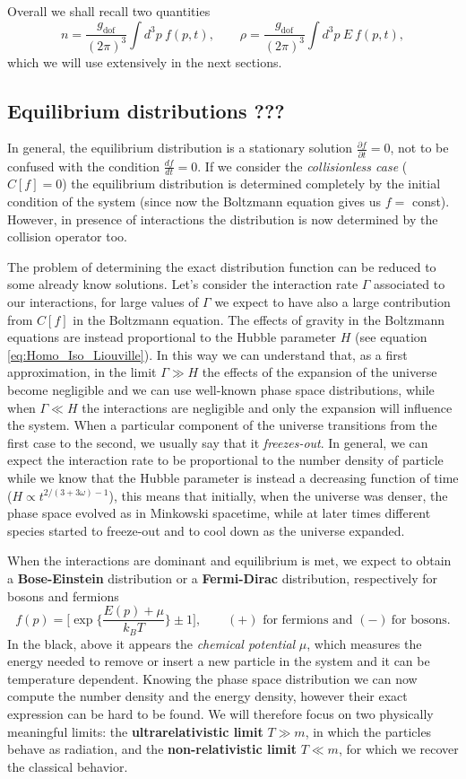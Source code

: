 Overall we shall recall two quantities
$$
n=\frac{g_\text{dof}}{(2\pi)^3}\int d^3p\ f(p,t),\qquad \rho=\frac{g_\text{dof}}{(2\pi)^3}\int d^3p\ E\ f(p,t),
$$
which we will use extensively in the next sections.
\subsection{Equilibrium distributions ???}
In general, the equilibrium distribution is a stationary solution $\tfrac{\partial f}{\partial t}=0$, not to be confused with the condition $\tfrac{d f}{dt}=0$. If we consider the \emph{collisionless case} ($C[f]=0$) the equilibrium distribution is determined completely by the initial condition of the system (since now the Boltzmann equation gives us $f=$ const). However, in presence of interactions the distribution is now determined by the collision operator too. 

The problem of determining the exact distribution function can be reduced to some already know solutions. Let's consider the interaction rate $\Gamma$ associated to our interactions, for large values of $\Gamma$ we expect to have also a large contribution from $C[f]$ in the Boltzmann equation. The effects of gravity in the Boltzmann equations are instead proportional to the Hubble parameter $H$ (see equation \eqref{eq:Homo_Iso_Liouville}). In this way we can understand that, as a first approximation, in the limit $\Gamma\gg H$ the effects of the expansion of the universe become negligible and we can use well-known phase space distributions, while when $\Gamma\ll H$ the interactions are negligible and only the expansion will influence the system. When a particular component of the universe transitions from the first case to the second, we usually say that it \emph{freezes-out}. In general, we can expect the interaction rate to be proportional to the number density of particle while we know that the Hubble parameter is instead a decreasing function of time ($H\propto t^{2/(3+3\omega)-1}$), this means that initially, when the universe was denser, the phase space evolved as in Minkowski spacetime, while at later times different species started to freeze-out and to cool down as the universe expanded.

When the interactions are dominant and equilibrium is met, we expect to obtain a \textbf{Bose-Einstein} distribution or a \textbf{Fermi-Dirac} distribution, respectively for bosons and fermions
\begin{equation}
    \label{eq:BE_FD_distributions}
    f(p)=\bigg[\exp\bigg\{\frac{E(p)+\mu}{k_BT}\bigg\}\pm1\bigg],\qquad (+) \text{ for fermions and } (-)\ \text{for bosons.}
\end{equation}
In the black, above it appears the \emph{chemical potential} $\mu$, which measures the energy needed to remove or insert a new particle in the system and it can be temperature dependent. Knowing the phase space distribution we can now compute the number density and the energy density, however their exact expression can be hard to be found. We will therefore focus on two physically meaningful limits: the \textbf{ultrarelativistic limit} $T\gg m$, in which the particles behave as radiation, and the \textbf{non-relativistic limit } $T\ll m$, for which we recover the classical behavior.
